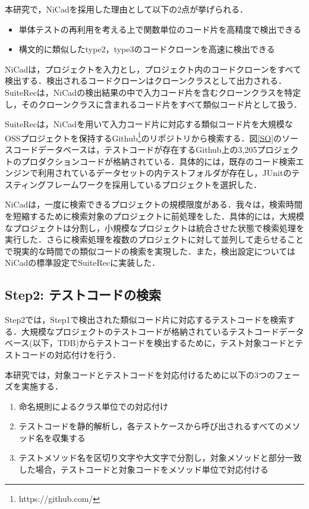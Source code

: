 \documentclass[12pt]{jarticle} %
\begin{document}
本研究で，{\sf NiCad}を採用した理由として以下の2点が挙げられる．

\begin{itemize}
\item 単体テストの再利用を考える上で関数単位のコード片を高精度で検出できる
\item 構文的に類似したtype2，type3のコードクローンを高速に検出できる
\end{itemize}


{\sf NiCad}は，プロジェクトを入力とし，プロジェクト内のコードクローンをすべて検出する．検出されるコードクローンはクローンクラスとして出力される．{\sf SuiteRec}は，{\sf NiCad}の検出結果の中で入力コード片を含むクローンクラスを特定し，そのクローンクラスに含まれるコード片をすべて類似コード片として扱う．

{\sf SuiteRec}は，{\sf NiCad}を用いて入力コード片に対応する類似コード片を大規模なOSSプロジェクトを保持するGithub\footnote{https://github.com/}のリポジトリから検索する．図\ref{SO}のソースコードデータベースは，テストコードが存在するGithub上の3,205プロジェクトのプロダクションコードが格納されている．具体的には，既存のコード検索エンジンで利用されているデータセット\cite{FaCoY}の内テストフォルダが存在し，JUnitのテスティングフレームワークを採用しているプロジェクトを選択した．

{\sf NiCad}は，一度に検索できるプロジェクトの規模限度がある．我々は，検索時間を短縮するために検索対象のプロジェクトに前処理をした．具体的には，大規模なプロジェクトは分割し，小規模なプロジェクトは統合させた状態で検索処理を実行した．さらに検索処理を複数のプロジェクトに対して並列して走らせることで現実的な時間での類似コードの検索を実現した．また，検出設定については{\sf NiCad}の標準設定で{\sf SuiteRec}に実装した．

\subsection{Step2: テストコードの検索}
Step2では，Step1で検出された類似コード片に対応するテストコードを検索する．大規模なプロジェクトのテストコードが格納されているテストコードデータベース(以下，TDB)からテストコードを検出するために，テスト対象コードとテストコードの対応付けを行う．

本研究では，対象コードとテストコードを対応付けるために以下の3つのフェーズを実施する．

\begin{enumerate}
  \item 命名規則によるクラス単位での対応付け
  \item テストコードを静的解析し，各テストケースから呼び出されるすべてのメソッド名を収集する
  \item テストメソッド名を区切り文字や大文字で分割し，対象メソッドと部分一致した場合，テストコードと対象コードをメソッド単位で対応付ける
\end{enumerate}
\end{document}
